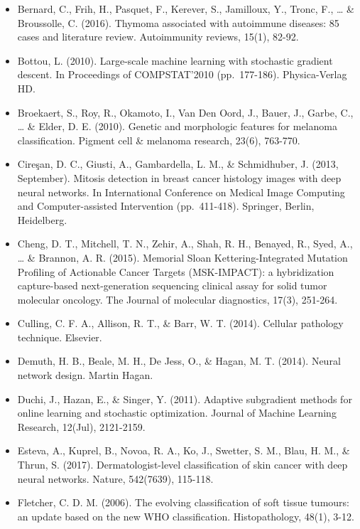 \documentclass[12pt,]{article}
\providecommand{\tightlist}{%
  \setlength{\itemsep}{0pt}\setlength{\parskip}{0pt}}
\begin{document}
\begin{itemize}
\tightlist
\item
  Bernard, C., Frih, H., Pasquet, F., Kerever, S., Jamilloux, Y., Tronc,
  F., \ldots{} \& Broussolle, C. (2016). Thymoma associated with
  autoimmune diseases: 85 cases and literature review. Autoimmunity
  reviews, 15(1), 82-92.
\item
  Bottou, L. (2010). Large-scale machine learning with stochastic
  gradient descent. In Proceedings of COMPSTAT'2010 (pp.~177-186).
  Physica-Verlag HD.
\item
  Broekaert, S., Roy, R., Okamoto, I., Van Den Oord, J., Bauer, J.,
  Garbe, C., \ldots{} \& Elder, D. E. (2010). Genetic and morphologic
  features for melanoma classification. Pigment cell \& melanoma
  research, 23(6), 763-770.
\item
  Cireşan, D. C., Giusti, A., Gambardella, L. M., \& Schmidhuber, J.
  (2013, September). Mitosis detection in breast cancer histology images
  with deep neural networks. In International Conference on Medical
  Image Computing and Computer-assisted Intervention (pp.~411-418).
  Springer, Berlin, Heidelberg.
\item
  Cheng, D. T., Mitchell, T. N., Zehir, A., Shah, R. H., Benayed, R.,
  Syed, A., \ldots{} \& Brannon, A. R. (2015). Memorial Sloan
  Kettering-Integrated Mutation Profiling of Actionable Cancer Targets
  (MSK-IMPACT): a hybridization capture-based next-generation sequencing
  clinical assay for solid tumor molecular oncology. The Journal of
  molecular diagnostics, 17(3), 251-264.
\item
  Culling, C. F. A., Allison, R. T., \& Barr, W. T. (2014). Cellular
  pathology technique. Elsevier.
\item
  Demuth, H. B., Beale, M. H., De Jess, O., \& Hagan, M. T. (2014).
  Neural network design. Martin Hagan.
\item
  Duchi, J., Hazan, E., \& Singer, Y. (2011). Adaptive subgradient
  methods for online learning and stochastic optimization. Journal of
  Machine Learning Research, 12(Jul), 2121-2159.
\item
  Esteva, A., Kuprel, B., Novoa, R. A., Ko, J., Swetter, S. M., Blau, H.
  M., \& Thrun, S. (2017). Dermatologist-level classification of skin
  cancer with deep neural networks. Nature, 542(7639), 115-118.
\item
  Fletcher, C. D. M. (2006). The evolving classification of soft tissue
  tumours: an update based on the new WHO classification.
  Histopathology, 48(1), 3-12.

\end{itemize}
\end{document}

